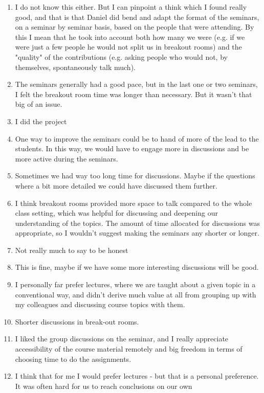 \documentclass[a4paper]{report}
\begin{document}
\begin{enumerate}
  \item I do not know this either. But I can pinpoint a think which I found really good, and that is that Daniel did bend and adapt the format of the seminars, on a seminar by seminar basis, based on the people that were attending. By this I mean that he took into account both how many we were (e.g. if we were just a few people he would not split us in breakout rooms) and the "quality" of the contributions (e.g. asking people who would not, by themselves, spontaneously talk much).
  \item The seminars generally had a good pace, but in the last one or two seminars, I felt the breakout room time was longer than necessary. But it wasn't that big of an issue. 
  \item I did the project
  \item One way to improve the seminars could be to hand of more of the lead to the students. In this way, we would have to engage more in discussions and be more active during the seminars.
  \item Sometimes we had way too long time for discussions. Maybe if the questions where a bit more detailed we could have discussed them further.
  \item I think breakout rooms provided more space to talk compared to the whole class setting, which was helpful for discussing and deepening our understanding of the topics. The amount of time allocated for discussions was appropriate, so I wouldn’t suggest making the seminars any shorter or longer.
  \item Not really much to say to be honest
  \item This is fine, maybe if we have some more interesting discussions will be good.
  \item I personally far prefer lectures, where we are taught about a given topic in a conventional way, and didn't derive much value at all from grouping up with my colleagues and discussing course topics with them.
  \item Shorter discussions in break-out rooms.
  \item I liked the group discussions on the seminar, and I really appreciate accessibility of the course material remotely and big freedom in terms of choosing time to do the assignments.
  \item I think that for me I would prefer lectures - but that is a personal preference. It was often hard for us to reach conclusions on our own

\end{enumerate}
\end{document}
